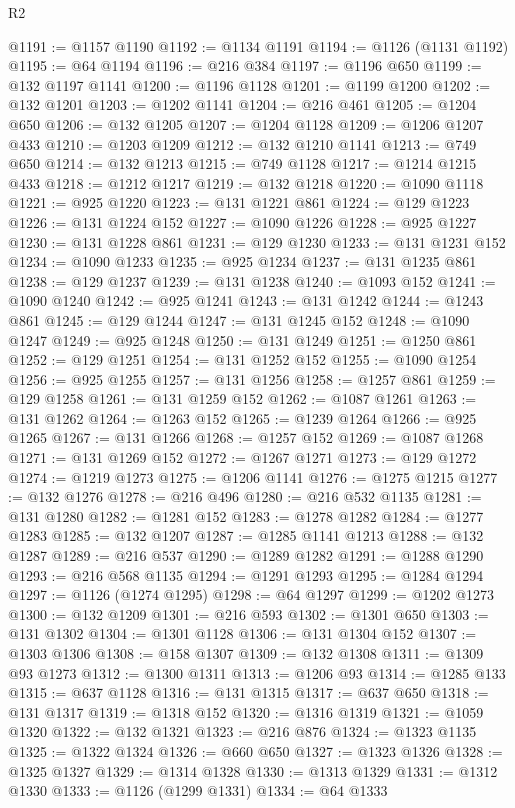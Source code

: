 \begin{lexlean}{R2}
\begin{coremodule}
@1191 := @1157 @1190
@1192 := @1134 @1191
@1194 := @1126 (@1131 @1192)
@1195 := @64 @1194
@1196 := @216 @384
@1197 := @1196 @650
@1199 := @132 @1197 @1141
@1200 := @1196 @1128
@1201 := @1199 @1200
@1202 := @132 @1201
@1203 := @1202 @1141
@1204 := @216 @461
@1205 := @1204 @650
@1206 := @132 @1205
@1207 := @1204 @1128
@1209 := @1206 @1207 @433
@1210 := @1203 @1209
@1212 := @132 @1210 @1141
@1213 := @749 @650
@1214 := @132 @1213
@1215 := @749 @1128
@1217 := @1214 @1215 @433
@1218 := @1212 @1217
@1219 := @132 @1218
@1220 := @1090 @1118
@1221 := @925 @1220
@1223 := @131 @1221 @861
@1224 := @129 @1223
@1226 := @131 @1224 @152
@1227 := @1090 @1226
@1228 := @925 @1227
@1230 := @131 @1228 @861
@1231 := @129 @1230
@1233 := @131 @1231 @152
@1234 := @1090 @1233
@1235 := @925 @1234
@1237 := @131 @1235 @861
@1238 := @129 @1237
@1239 := @131 @1238
@1240 := @1093 @152
@1241 := @1090 @1240
@1242 := @925 @1241
@1243 := @131 @1242
@1244 := @1243 @861
@1245 := @129 @1244
@1247 := @131 @1245 @152
@1248 := @1090 @1247
@1249 := @925 @1248
@1250 := @131 @1249
@1251 := @1250 @861
@1252 := @129 @1251
@1254 := @131 @1252 @152
@1255 := @1090 @1254
@1256 := @925 @1255
@1257 := @131 @1256
@1258 := @1257 @861
@1259 := @129 @1258
@1261 := @131 @1259 @152
@1262 := @1087 @1261
@1263 := @131 @1262
@1264 := @1263 @152
@1265 := @1239 @1264
@1266 := @925 @1265
@1267 := @131 @1266
@1268 := @1257 @152
@1269 := @1087 @1268
@1271 := @131 @1269 @152
@1272 := @1267 @1271
@1273 := @129 @1272
@1274 := @1219 @1273
@1275 := @1206 @1141
@1276 := @1275 @1215
@1277 := @132 @1276
@1278 := @216 @496
@1280 := @216 @532 @1135
@1281 := @131 @1280
@1282 := @1281 @152
@1283 := @1278 @1282
@1284 := @1277 @1283
@1285 := @132 @1207
@1287 := @1285 @1141 @1213
@1288 := @132 @1287
@1289 := @216 @537
@1290 := @1289 @1282
@1291 := @1288 @1290
@1293 := @216 @568 @1135
@1294 := @1291 @1293
@1295 := @1284 @1294
@1297 := @1126 (@1274 @1295)
@1298 := @64 @1297
@1299 := @1202 @1273
@1300 := @132 @1209
@1301 := @216 @593
@1302 := @1301 @650
@1303 := @131 @1302
@1304 := @1301 @1128
@1306 := @131 @1304 @152
@1307 := @1303 @1306
@1308 := @158 @1307
@1309 := @132 @1308
@1311 := @1309 @93 @1273
@1312 := @1300 @1311
@1313 := @1206 @93
@1314 := @1285 @133
@1315 := @637 @1128
@1316 := @131 @1315
@1317 := @637 @650
@1318 := @131 @1317
@1319 := @1318 @152
@1320 := @1316 @1319
@1321 := @1059 @1320
@1322 := @132 @1321
@1323 := @216 @876
@1324 := @1323 @1135
@1325 := @1322 @1324
@1326 := @660 @650
@1327 := @1323 @1326
@1328 := @1325 @1327
@1329 := @1314 @1328
@1330 := @1313 @1329
@1331 := @1312 @1330
@1333 := @1126 (@1299 @1331)
@1334 := @64 @1333

\end{coremodule}
\end{lexlean}

